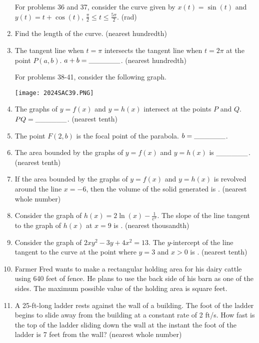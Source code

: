 \documentclass[../uilmath.tex]{subfiles}
\begin{document}
\begin{enumerate}[label=\bfseries\arabic*.]
    For problems 36 and 37, consider the curve given by $x(t)=\sin(t)$ and $y(t)=t+\cos(t)$, $\frac{\pi}{2}\leq t\leq \frac{5\pi}{2}$. (rad)
    \item %
    Find the length of the curve. (nearest hundredth)

    \item %
    The tangent line when $t=\pi$ intersects the tangent line when $t=2\pi$ at the point $P(a,b)$. $a+b=\_\_\_\_\_\_$. (nearest hundredth)


    For problems 38-41, consider the following graph.
    \begin{center}
        \texttt{[image: 2024SAC39.PNG]}
    \end{center}
    \item %
    The graphs of $y=f(x)$ and $y=h(x)$ intersect at the points $P$ and $Q$. $PQ=\_\_\_\_\_\_$. (nearest tenth)

    \item %
    The point $F(2,b)$ is the focal point of the parabola. $b=\_\_\_\_\_\_$.

    \item %
    The area bounded by the graphs of $y=f(x)$ and $y=h(x)$ is $\_\_\_\_\_\_$. (nearest tenth)

    \item %
    If the area bounded by the graphs of $y=f(x)$ and $y=h(x)$ is revolved around the line $x=-6$, then the volume 
    of the solid generated is \blank. (nearest whole number)

    \item %
    Consider the graph of $h(x)=2\ln(x)-\frac{1}{e^x}$. The slope of the line tangent 
    to the graph of $h(x)$ at $x=9$ is \blank. (nearest thousandth)

    \item %
    Consider the graph of $2xy^2-3y+4x^2=13$. The $y$-intercept of the line tangent to the curve at the point where $y=3$ and $x>0$ is \blank. (nearest tenth)

    \item %
    Farmer Fred wants to make a rectangular holding area for his dairy cattle using 640 feet of fence. He plans to use the 
    back side of his barn as one of the sides. The maximum possible value of the holding area is \blank square feet.

    \item %
    A 25-ft-long ladder rests against the wall of a building. The foot of the ladder begins to slide away from the building at a constant rate of 2 ft/s. How fast 
    is the top of the ladder sliding down the wall at the instant the foot of the ladder is 7 feet from the wall? (nearest whole number)


\end{enumerate}
\end{document}
